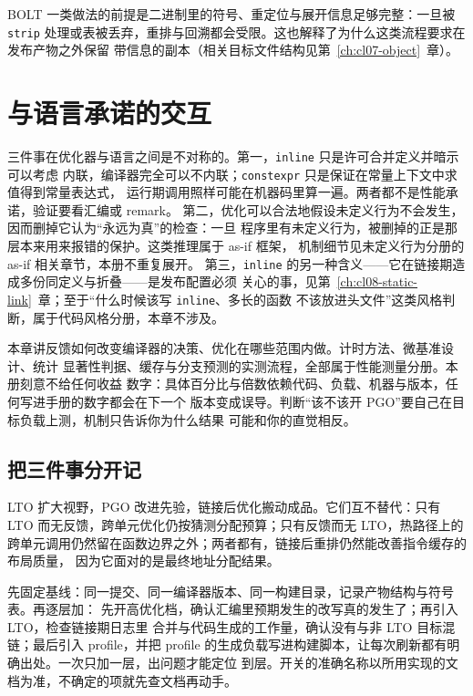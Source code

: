\documentclass[12pt,a4paper,fontset=fandol]{ctexbook}
\newcommand{\Tp}[1]{\texttt{#1}}
\newcommand{\Tool}[1]{\texttt{#1}}
\newcommand{\Mx}[1]{\textsf{#1}}
\begin{document}
\Mx{BOLT} 一类做法的前提是二进制里的符号、重定位与展开信息足够完整：一旦被 \Tool{strip}
处理或表被丢弃，重排与回溯都会受限。这也解释了为什么这类流程要求在发布产物之外保留
带信息的副本（相关目标文件结构见第~\ref{ch:cl07-object}~章）。

\section{与语言承诺的交互}\label{sec:cl05-promises}

\begin{warning}[title={许可不是保证}]
三件事在优化器与语言之间是不对称的。第一，\Tp{inline} 只是许可合并定义并暗示可以考虑
内联，编译器完全可以不内联；\Tp{constexpr} 只是保证在常量上下文中求值得到常量表达式，
运行期调用照样可能在机器码里算一遍。两者都不是性能承诺，验证要看汇编或 \Mx{remark}。
第二，优化可以合法地假设未定义行为不会发生，因而删掉它认为“永远为真”的检查：一旦
程序里有未定义行为，被删掉的正是那层本来用来报错的保护。这类推理属于 as-if 框架，
机制细节见未定义行为分册的 as-if 相关章节，本册不重复展开。
第三，\Tp{inline} 的另一种含义——它在链接期造成多份同定义与折叠——是发布配置必须
关心的事，见第~\ref{ch:cl08-static-link}~章；至于“什么时候该写 \Tp{inline}、多长的函数
不该放进头文件”这类风格判断，属于代码风格分册，本章不涉及。
\end{warning}

\begin{note}[title={本册的边界：只讲机制}]
本章讲反馈如何改变编译器的决策、优化在哪些范围内做。计时方法、微基准设计、统计
显著性判据、缓存与分支预测的实测流程，全部属于性能测量分册。本册刻意不给任何收益
数字：具体百分比与倍数依赖代码、负载、机器与版本，任何写进手册的数字都会在下一个
版本变成误导。判断“该不该开 \Mx{PGO}”要自己在目标负载上测，机制只告诉你为什么结果
可能和你的直觉相反。
\end{note}

\subsection{把三件事分开记}\label{sec:cl05-recap}

\Mx{LTO} 扩大视野，\Mx{PGO} 改进先验，链接后优化搬动成品。它们互不替代：只有
\Mx{LTO} 而无反馈，跨单元优化仍按猜测分配预算；只有反馈而无 \Mx{LTO}，热路径上的
跨单元调用仍然留在函数边界之外；两者都有，链接后重排仍然能改善指令缓存的布局质量，
因为它面对的是最终地址分配结果。

\begin{bestpractice}[title={反馈类优化的落地顺序}]
先固定基线：同一提交、同一编译器版本、同一构建目录，记录产物结构与符号表。再逐层加：
先开高优化档，确认汇编里预期发生的改写真的发生了；再引入 \Mx{LTO}，检查链接期日志里
合并与代码生成的工作量，确认没有与非 \Mx{LTO} 目标混链；最后引入 \Mx{profile}，并把
profile 的生成负载写进构建脚本，让每次刷新都有明确出处。一次只加一层，出问题才能定位
到层。开关的准确名称以所用实现的文档为准，不确定的项就先查文档再动手。
\end{bestpractice}
\end{document}
